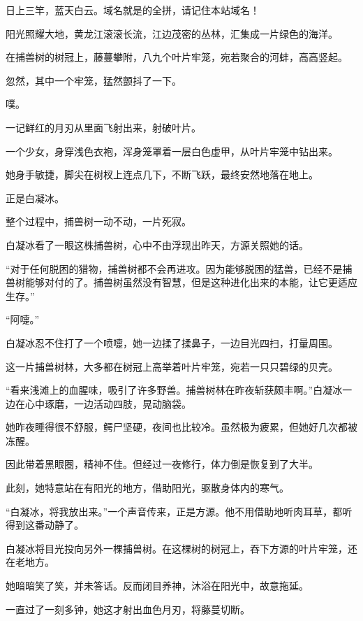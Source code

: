 
\begin{this_body}

日上三竿，蓝天白云。域名就是的全拼，请记住本站域名！

阳光照耀大地，黄龙江滚滚长流，江边茂密的丛林，汇集成一片绿色的海洋。

在捕兽树的树冠上，藤蔓攀附，八九个叶片牢笼，宛若聚合的河蚌，高高竖起。

忽然，其中一个牢笼，猛然颤抖了一下。

噗。

一记鲜红的月刃从里面飞射出来，射破叶片。

一个少女，身穿浅色衣袍，浑身笼罩着一层白色虚甲，从叶片牢笼中钻出来。

她身手敏捷，脚尖在树杈上连点几下，不断飞跃，最终安然地落在地上。

正是白凝冰。

整个过程中，捕兽树一动不动，一片死寂。

白凝冰看了一眼这株捕兽树，心中不由浮现出昨天，方源关照她的话。

“对于任何脱困的猎物，捕兽树都不会再进攻。因为能够脱困的猛兽，已经不是捕兽树能够对付的了。捕兽树虽然没有智慧，但是这种进化出来的本能，让它更适应生存。”

“阿嚏。”

白凝冰忍不住打了一个喷嚏，她一边揉了揉鼻子，一边目光四扫，打量周围。

这一片捕兽树林，大多都在树冠上高举着叶片牢笼，宛若一只只碧绿的贝壳。

“看来浅滩上的血腥味，吸引了许多野兽。捕兽树林在昨夜斩获颇丰啊。”白凝冰一边在心中琢磨，一边活动四肢，晃动脑袋。

她昨夜睡得很不舒服，鳄尸坚硬，夜间也比较冷。虽然极为疲累，但她好几次都被冻醒。

因此带着黑眼圈，精神不佳。但经过一夜修行，体力倒是恢复到了大半。

此刻，她特意站在有阳光的地方，借助阳光，驱散身体内的寒气。

“白凝冰，将我放出来。”一个声音传来，正是方源。他不用借助地听肉耳草，都听得到这番动静了。

白凝冰将目光投向另外一棵捕兽树。在这棵树的树冠上，吞下方源的叶片牢笼，还在老地方。

她暗暗笑了笑，并未答话。反而闭目养神，沐浴在阳光中，故意拖延。

一直过了一刻多钟，她这才射出血色月刃，将藤蔓切断。


\end{this_body}
